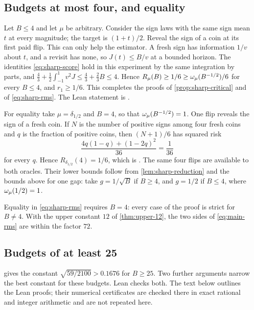 \subsection{Budgets at most four, and equality}\label{sec:sharp-small}

Let $B\le4$ and let $\mu$ be arbitrary. Consider the sign laws with the
same sign mean $t$ at every magnitude; the target is $(1+t)/2$. Reveal the
sign of a coin at its first paid flip. This can only help the estimator.
A fresh sign has information $1/v$ about $t$, and a revisit has none, so
$J(t)\le B/v$ at a bounded horizon. The identities
\eqref{eq:sharp-score} hold in this experiment by the same integration by
parts, and
$\tfrac43+\tfrac12\int_{-1}^1v^2J\le\tfrac43+\tfrac23B\le4$. Hence
$R_\mu(B)\ge1/6\ge\omega_\mu(B^{-1/2})/6$ for every $B\le4$, and $r_1\ge1/6$.
This completes the proofs of \cref{prop:sharp-critical} and of
\eqref{eq:sharp-rms}. The Lean statement is
.

For equality take $\mu=\delta_{1/2}$ and $B=4$, so that
$\omega_\mu(B^{-1/2})=1$. One flip reveals the sign of a fresh coin. If $N$ is
the number of positive signs among four fresh coins and $q$ is the
fraction of positive coins, then $(N+1)/6$ has squared risk
\[
 \frac{4q(1-q)+(1-2q)^2}{36}=\frac1{36}
\]
for every $q$. Hence $R_{\delta_{1/2}}(4)=1/6$, which is
. The same four
flips are available to both oracles. Their lower bounds follow from
\cref{lem:sharp-reduction} and the bounds above for one gap: take
$g=1/\sqrt B$ if $B\ge4$, and $g=1/2$ if $B\le4$, where $\omega_\mu(1/2)=1$.

\begin{remark}
Equality in \eqref{eq:sharp-rms} requires $B=4$: every case of the proof
is strict for $B\ne4$. With the upper constant $12$ of
\cref{thm:upper-12}, the two sides of \eqref{eq:main-rms} are within the
factor $72$.
\end{remark}

\subsection{Budgets of at least 25}\label{sec:sharp-bracket}

 gives the constant $\sqrt{59/2100}>0.1676$ for
$B\ge25$. Two further arguments narrow the best constant for these
budgets. Lean checks both. The text below outlines the Lean proofs; their
numerical certificates are checked there in exact rational and integer
arithmetic and are not repeated here.

